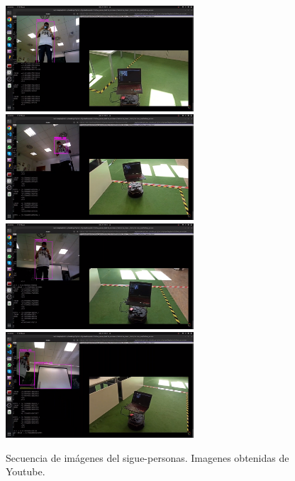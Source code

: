\begin{figure} [H]
    \begin{center}
        \includegraphics[width=7cm]{figs/c5/fp_final1.png}
        \includegraphics[width=7cm]{figs/c5/fp_final2.png}
        \includegraphics[width=7cm]{figs/c5/fp_final3.png}
        \includegraphics[width=7cm]{figs/c5/fp_final4.png}
    \end{center}
    \caption[Secuencia sigue-personas resultado final]{Secuencia de imágenes del sigue-personas. Imagenes obtenidas de Youtube\footnotemark.}
    \label{fig:sec_FP_final}
\end{figure}








